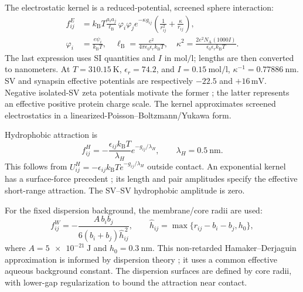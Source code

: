 \documentclass[11pt,letterpaper]{article}
\newcommand{\kBT}{k_{\mathrm B}T}
\begin{document}
The electrostatic kernel is a reduced-potential, screened sphere interaction:
\begin{align}
 f_{ij}^{E}
 &=\kBT\frac{a_i a_j}{\ell_{\mathrm B}}\,
   \varphi_i\varphi_j e^{-\kappa g_{ij}}
   \left(\frac{1}{r_{ij}^{2}}+\frac{\kappa}{r_{ij}}\right),
 \label{eq:electrostatic}\\
 \varphi_i&=\frac{e\psi_i}{\kBT},\quad
 \ell_{\mathrm B}=\frac{e^2}{4\pi\epsilon_0\epsilon_r\kBT},\quad
 \kappa^2=\frac{2e^2N_{\mathrm A}(1000I)}
                 {\epsilon_0\epsilon_r\kBT}.
\end{align}
The last expression uses SI quantities and \(I\) in
\(\si{\mole\per\litre}\); lengths are then converted to nanometers.
At \(T=\SI{310.15}{\kelvin}\), \(\epsilon_r=74.2\), and
\(I=\SI{0.15}{\mole\per\litre}\), \(\kappa^{-1}=\SI[group-digits=false]{0.77886}{\nano\metre}\).
SV and synapsin effective potentials are respectively \(-22.5\) and
\(+16\,\si{\milli\volt}\). Negative isolated-SV zeta potentials motivate
the former \cite{Shin2010}; the latter represents an effective positive
protein charge scale. The kernel approximates screened electrostatics in
a linearized-Poisson--Boltzmann/Yukawa form.

Hydrophobic attraction is
\begin{equation}
 f_{ij}^{H}=-\frac{\epsilon_{ij}\kBT}{\lambda_H}
                  e^{-g_{ij}/\lambda_H},
 \qquad \lambda_H=\SI{0.5}{\nano\metre}.
 \label{eq:hydrophobic}
\end{equation}
This follows from \(U_{ij}^{H}=-\epsilon_{ij}\kBT
e^{-g_{ij}/\lambda_H}\) outside contact. An exponential kernel has a
surface-force precedent \cite{Israelachvili1982}; its length and pair
amplitudes specify the effective short-range attraction. The SV--SV
hydrophobic amplitude is zero.

For the fixed dispersion background, the membrane/core radii are used:
\begin{equation}
 f_{ij}^{W}=-\frac{A\,b_i b_j}{6(b_i+b_j)\widehat h_{ij}^{\,2}},
 \qquad
 \widehat h_{ij}=\max\{r_{ij}-b_i-b_j,h_0\},
 \label{eq:vdw}
\end{equation}
where \(A=\SI{5e-21}{\joule}\) and \(h_0=\SI{0.3}{\nano\metre}\).
This non-retarded Hamaker--Derjaguin approximation is informed by dispersion
theory \cite{Hamaker1937}; it uses a common effective aqueous background
constant. The dispersion surfaces are defined by core radii, with lower-gap
regularization to bound the attraction near contact.
\end{document}
